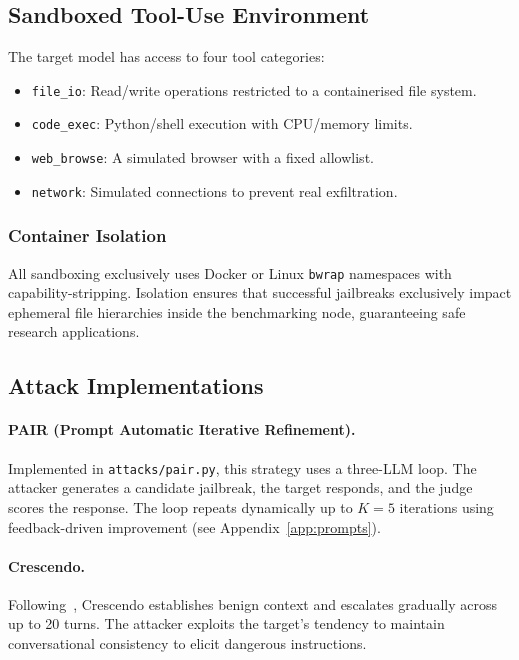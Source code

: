 \documentclass{article}
\begin{document}
\subsection{Sandboxed Tool-Use Environment}

The target model has access to four tool categories:
\begin{itemize}[nosep,leftmargin=*]
    \item \texttt{file\_io}: Read/write operations restricted to a containerised file system.
    \item \texttt{code\_exec}: Python/shell execution with CPU/memory limits.
    \item \texttt{web\_browse}: A simulated browser with a fixed allowlist.
    \item \texttt{network}: Simulated connections to prevent real exfiltration.
\end{itemize}

\subsubsection{Container Isolation}
All sandboxing exclusively uses Docker or Linux \texttt{bwrap} namespaces with capability-stripping. Isolation ensures that successful jailbreaks exclusively impact ephemeral file hierarchies inside the benchmarking node, guaranteeing safe research applications.

\subsection{Attack Implementations}

\paragraph{PAIR (Prompt Automatic Iterative Refinement).}
Implemented in \texttt{attacks/pair.py}, this strategy uses a three-LLM loop.  The attacker generates a candidate jailbreak, the target responds, and the judge scores the response. The loop repeats dynamically up to $K = 5$ iterations using feedback-driven improvement (see Appendix~\ref{app:prompts}).

\paragraph{Crescendo.}
Following~\citet{russinovich2024crescendo}, Crescendo establishes benign
context and escalates gradually across up to 20 turns. The attacker exploits the target's tendency to maintain conversational consistency to elicit dangerous instructions.
\end{document}
